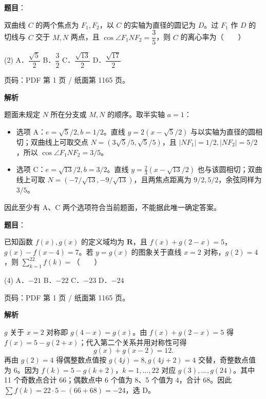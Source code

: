 \begin{answer}

\textbf{题目}：

双曲线 $C$ 的两个焦点为 $F_1,F_2$，以 $C$ 的实轴为直径的圆记为 $D$。过 $F_1$ 作 $D$ 的切线与 $C$ 交于 $M,N$ 两点，且 $\cos\angle F_1NF_2=\dfrac35$，则 $C$ 的离心率为\mbox{（　　）}

\begin{gkopts}(2)
\task A．$\dfrac{\sqrt5}{2}$
\task B．$\dfrac32$
\task C．$\dfrac{\sqrt{13}}2$
\task D．$\dfrac{\sqrt{17}}2$
\end{gkopts}

\begin{gktip}
页码：PDF 第 1 页 / 纸面第 1165 页。
\end{gktip}

\textbf{解析}

题面未规定 $N$ 所在分支或 $M,N$ 的顺序。取半实轴 $a=1$：

\begin{itemize}
\item 选项 A：$e=\sqrt5/2,b=1/2$。直线 $y=2(x-\sqrt5/2)$ 与以实轴为直径的圆相切；双曲线上可取交点 $N=(3\sqrt5/5,\sqrt5/5)$，且 $|NF_1|=1/2,|NF_2|=5/2$，所以 $\cos\angle F_1NF_2=3/5$。
\item 选项 C：$e=\sqrt{13}/2,b=3/2$。直线 $y=\frac23(x-\sqrt{13}/2)$ 也与该圆相切；双曲线上可取 $N=(-7/\sqrt{13},-9/\sqrt{13})$，且两焦点距离为 $9/2,5/2$，余弦同样为 $3/5$。
\end{itemize}

因此至少有 A、C 两个选项符合当前题面，不能据此唯一确定答案。


\end{answer}
\begin{answer}

\textbf{题目}：

已知函数 $f(x),g(x)$ 的定义域均为 $\mathbf R$，且 $f(x)+g(2-x)=5$，$g(x)-f(x-4)=7$。若 $y=g(x)$ 的图象关于直线 $x=2$ 对称，$g(2)=4$，则 $\displaystyle\sum_{k=1}^{22}f(k)=$\mbox{（　　）}

\begin{gkopts}(4)
\task A．$-21$
\task B．$-22$
\task C．$-23$
\task D．$-24$
\end{gkopts}

\begin{gktip}
页码：PDF 第 1 页 / 纸面第 1165 页。
\end{gktip}

\textbf{解析}

$g$ 关于 $x=2$ 对称即 $g(4-x)=g(x)$。由 $f(x)+g(2-x)=5$ 得 $f(x)=5-g(2+x)$；代入第二个关系并用对称性可得
\nopagebreak[4]
\[
g(x)+g(x-2)=12.
\]
再由 $g(2)=4$ 得偶整数点值按 $g(4j)=8,g(4j+2)=4$ 交替，奇整数点值为 $6$。因为 $f(k)=5-g(k+2)$，$k=1,\ldots,22$ 对应 $g(3),\ldots,g(24)$。其中 11 个奇数点合计 $66$；偶数点中 6 个值为 $8$、5 个值为 $4$，合计 $68$。因此 $\sum f(k)=22\cdot5-(66+68)=-24$，选 D。


\end{answer}

